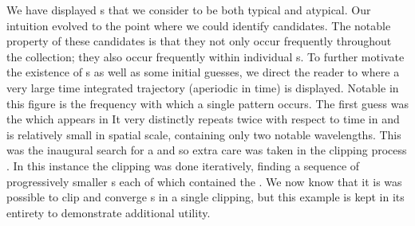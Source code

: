 We have displayed {\po}s that we consider to be both typical and atypical.
Our intuition evolved to the point where we could identify {\fpo} candidates.
The notable property of these candidates is that they not only occur frequently throughout the
{\po} collection; they also occur frequently within individual {\po}s.
To further motivate the existence of
{\fpo}s as well as some initial guesses, we direct the reader to %
where a very large time integrated trajectory (aperiodic in time)
is displayed. Notable in this figure is the {\spt}
frequency with which a single pattern occurs.
The first guess was the {\wiggle} which appears in%
It very distinctly repeats twice with respect to time in
and is relatively small in spatial scale, containing only two notable wavelengths.
This was the inaugural search for a {\fpo} and so extra
care was taken in the clipping process .
In this instance the clipping was done iteratively, finding
a sequence of progressively smaller {\po}s each of which contained the {\fpo}.
We now know that it is was possible to clip and converge {\fpo}s in a single clipping,
but this example is kept in its entirety to demonstrate additional utility.

